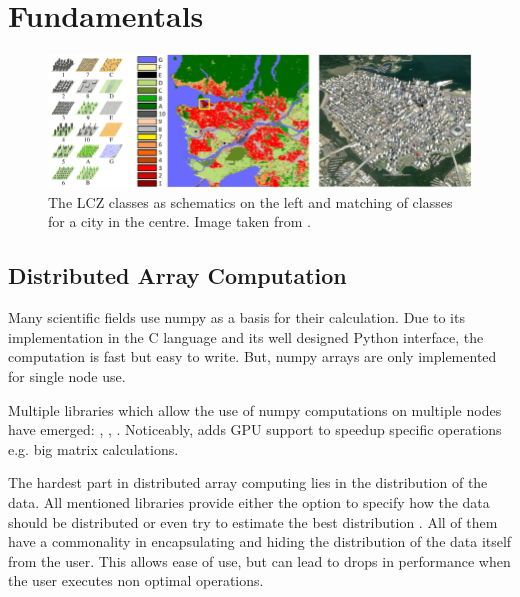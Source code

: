 \section{Fundamentals}
\label{sec:fundamentals}

\begin{figure}[t]
  \centering
  \includegraphics[width=0.9\linewidth]{images/schematic-lcz.png}
  \caption{The LCZ classes as schematics on the left and matching of classes for a city in the centre. Image taken from \cite{zhu_so2sat_2019}.}\label{fig:lcz_classes}
\end{figure}


\subsection{Distributed Array Computation}
\label{subsec:distributed_array_computation}
Many scientific fields use \gls{numpy} as a basis for their calculation. Due to its implementation in the C language and its well designed
Python interface, the computation is fast but easy to write. But, \gls{numpy} arrays are only implemented for single node use.

Multiple libraries which allow the use of \gls{numpy} computations on multiple nodes have emerged: \cite{bauer_legate_2019}, \cite{huang_spartan_nodate}, \cite{krajsek_helmholtz_nodate}.
Noticeably, \cite{bauer_legate_2019} adds \gls{GPU} support to speedup specific operations e.g. big matrix calculations.

The hardest part in distributed array computing lies in the distribution of the data. All mentioned libraries provide
either the option to specify how the data should be distributed or even try to estimate the best distribution \cite{huang_spartan_nodate}.
All of them have a commonality in encapsulating and hiding the distribution of the data itself from the user.
This allows ease of use, but can lead to drops in performance when the user executes non optimal operations.


